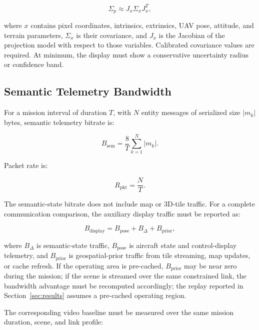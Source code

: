 \documentclass[fleqn]{VRIH2025}
\begin{document}
\begin{equation}
\Sigma_p \approx J_x \Sigma_x J_x^T,
\label{eq:uncertainty}
\end{equation}

where \(x\) contains pixel coordinates, intrinsics, extrinsics, UAV pose, attitude, and terrain parameters, \(\Sigma_x\) is their covariance, and \(J_x\) is the Jacobian of the projection model with respect to those variables. Calibrated covariance values are required. At minimum, the display must show a conservative uncertainty radius or confidence band.

\subsection{Semantic Telemetry Bandwidth}

For a mission interval of duration \(T\), with \(N\) entity messages of serialized size \(|m_k|\) bytes, semantic telemetry bitrate is:

\begin{equation}
B_{\mathrm{sem}} = \frac{8}{T}\sum_{k=1}^{N} |m_k|.
\label{eq:bandwidth}
\end{equation}

Packet rate is:

\begin{equation}
R_{\mathrm{pkt}} = \frac{N}{T}.
\label{eq:packet-rate}
\end{equation}

The semantic-state bitrate does not include map or 3D-tile traffic. For a complete communication comparison, the auxiliary display traffic must be reported as:

\begin{equation}
B_{\mathrm{display}} = B_{\mathrm{pose}} + B_{\Delta} + B_{\mathrm{prior}},
\label{eq:display-bandwidth}
\end{equation}

where \(B_{\Delta}\) is semantic-state traffic, \(B_{\mathrm{pose}}\) is aircraft state and control-display telemetry, and \(B_{\mathrm{prior}}\) is geospatial-prior traffic from tile streaming, map updates, or cache refresh. If the operating area is pre-cached, \(B_{\mathrm{prior}}\) may be near zero during the mission; if the scene is streamed over the same constrained link, the bandwidth advantage must be recomputed accordingly; the replay reported in Section~\ref{sec:results} assumes a pre-cached operating region.

The corresponding video baseline must be measured over the same mission duration, scene, and link profile:
\end{document}
